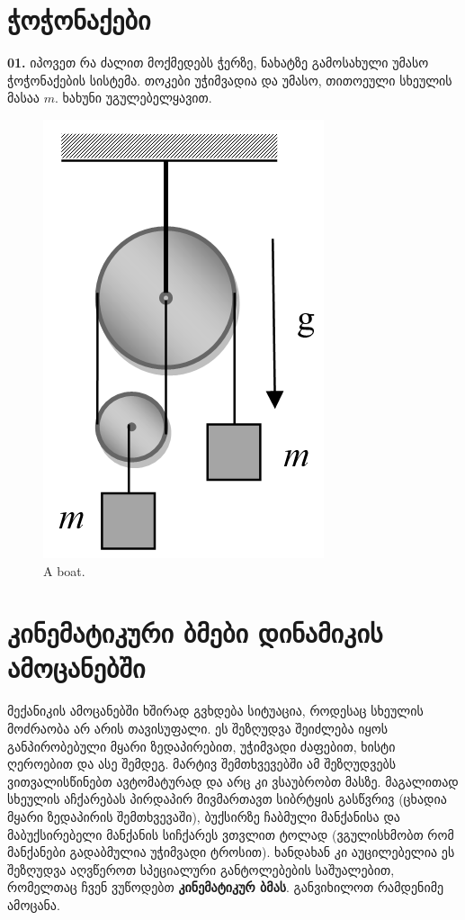 \documentclass[a4paper]{book}
\begin{document}
	\section{ჭოჭონაქები}
	\textbf{01.} იპოვეთ რა ძალით მოქმედებს ჭერზე, ნახატზე გამოსახული უმასო ჭოჭონაქების სისტემა. თოკები უჭიმვადია და უმასო,  თითოეული სხეულის მასაა $m$.  ხახუნი უგულებელყავით.
	 			\begin{figure}[H]
	 			\centering
           \includegraphics[width=0.2\columnwidth]{figures/03}
           \caption{A boat.}
           \label{fig:wowonaqi}
        \end{figure}

\section{კინემატიკური ბმები დინამიკის ამოცანებში}
მექანიკის ამოცანებში ხშირად გვხდება სიტუაცია, როდესაც სხეულის მოძრაობა არ არის თავისუფალი. ეს შეზღუდვა შეიძლება იყოს განპირობებული მყარი ზედაპირებით, უჭიმვადი ძაფებით, ხისტი ღეროებით და ასე შემდეგ. მარტივ შემთხვევებში ამ შეზღუდვებს ვითვალისწინებთ ავტომატურად და არც კი ვსაუბრობთ მასზე. მაგალითად სხეულის აჩქარებას პირდაპირ მივმართავთ სიბრტყის გასწვრივ (ცხადია მყარი ზედაპირის შემთხვევაში), ბუქსირზე ჩაბმული მანქანისა და მაბუქსირებელი მანქანის სიჩქარეს ვთვლით ტოლად (ვგულისხმობთ რომ მანქანები გადაბმულია უჭიმვადი ტროსით). ხანდახან კი აუცილებელია ეს შეზღუდვა აღვწეროთ სპეციალური განტოლებების საშუალებით, რომელთაც ჩვენ ვუწოდებთ \textbf{კინემატიკურ ბმას}. განვიხილოთ რამდენიმე ამოცანა.
 
\end{document}
